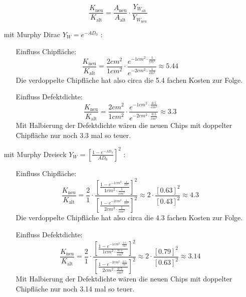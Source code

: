 \documentclass[a4paper,10pt,headsepline, DIV11]{scrartcl}%
\begin{document}
\begin{itemize}
\[\frac{K_{\text{neu}}}{K_{\text{alt}}} = \frac{A_{\text{neu}}}{A_{\text{alt}}} \cdot \frac{Y_{W_{\text{alt}}}}{Y_{W_{\text{neu}}}}\]
	\begin{itemize}
		\item[mit Murphy Dirac] $Y_W = e^{-AD_0}$ : \hfill
		\begin{itemize}
			\item[Einfluss Chipfläche:]
			\[\frac{K_{\text{neu}}}{K_{\text{alt}}} = \frac{2cm^2}{1cm^2} \cdot \frac{e^{-1cm^2\cdot\frac{1}{cm^2}}}{e^{-2cm^2\cdot \frac{1}{cm^2}}} \approx 5.44\]
			Die verdoppelte Chipfläche hat also circa die 5.4 fachen Kosten zur Folge.
			\item[Einfluss Defektdichte:]
			\[\frac{K_{\text{neu}}}{K_{\text{alt}}} = \frac{2cm^2}{1cm^2} \cdot \frac{e^{-1cm^2\cdot\frac{0.5}{cm^2}}}{e^{-2cm^2\cdot \frac{0.5}{cm^2}}} \approx 3.3\]
			Mit Halbierung der Defektdichte wären die neuen Chips mit doppelter Chipfläche nur noch 3.3 mal so teuer.
		\end{itemize}
		\item[mit Murphy Dreieck] $Y_W=\left[ \frac{1-e^{-AD_0}}{AD_0} \right]^2$ : \hfill \\
		\begin{itemize}
			\item[Einfluss Chipfläche:]
			\[\frac{K_{\text{neu}}}{K_{\text{alt}}} = \frac{2}{1} \cdot \frac{\left[ \frac{1-e^{-1cm^2\cdot\frac{1}{cm^2}}}{1cm^2\cdot\frac{1}{cm^2}} \right]^2}{\left[ \frac{1-e^{-2cm^2\cdot\frac{1}{cm^2}}}{2cm^2\cdot\frac{1}{cm^2}} \right]^2} \approx 2 \cdot \frac{\left[ 0.63 \right]^2}{\left[ 0.43 \right]^2} \approx 4.3\]
			Die verdoppelte Chipfläche hat also circa die 4.3 fachen Kosten zur Folge.
			\item[Einfluss Defektdichte:]
			\[\frac{K_{\text{neu}}}{K_{\text{alt}}} = \frac{2}{1} \cdot \frac{\left[ \frac{1-e^{-1cm^2\cdot\frac{0.5}{cm^2}}}{1cm^2\cdot\frac{0.5}{cm^2}} \right]^2}{\left[ \frac{1-e^{-2cm^2\cdot\frac{0.5}{cm^2}}}{2cm^2\cdot\frac{0.5}{cm^2}} \right]^2} \approx 2 \cdot \frac{\left[ 0.79 \right]^2}{\left[ 0.63 \right]^2} \approx 3.14\]
			Mit Halbierung der Defektdichte wären die neuen Chips mit doppelter Chipfläche nur noch 3.14 mal so teuer.
		\end{itemize}
	\end{itemize}
	\end{itemize}

	
\end{document}
